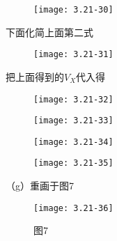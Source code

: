 \begin{figure}[H] %
	\begin{minipage}{\linewidth}
		\texttt{[image: 3.21-30]}
	\end{minipage}
\end{figure}

下面化简上面第二式

\begin{figure}[H] %
	\begin{minipage}{\linewidth}
		\texttt{[image: 3.21-31]}
	\end{minipage}
\end{figure}

把上面得到的$V_X$代入得

\begin{figure}[H] %
	\begin{minipage}{\linewidth}
		\texttt{[image: 3.21-32]}
	\end{minipage}
\end{figure}

\begin{figure}[H] %
	\begin{minipage}{\linewidth}
		\texttt{[image: 3.21-33]}
	\end{minipage}
\end{figure}

\begin{figure}[H] %
	\begin{minipage}{\linewidth}
		\texttt{[image: 3.21-34]}
	\end{minipage}
\end{figure}

\begin{figure}[H] %
	\begin{minipage}{\linewidth}
		\texttt{[image: 3.21-35]}
	\end{minipage}
\end{figure}

\scalebox{3}{（g）}

（g）重画于图7

\begin{figure}[H] %
	\begin{minipage}{\linewidth}
		\texttt{[image: 3.21-36]}
	\end{minipage}
	\caption*{图7} %
\end{figure}

